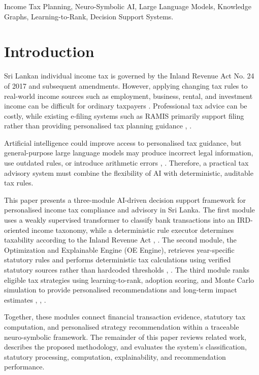 \documentclass[conference]{IEEEtran}
\begin{document}
\begin{IEEEkeywords}
Income Tax Planning, Neuro-Symbolic AI, Large Language Models, Knowledge Graphs, Learning-to-Rank, Decision Support Systems.
\end{IEEEkeywords}

\section{Introduction}
Sri Lankan individual income tax is governed by the Inland Revenue Act No. 24 of 2017 and subsequent amendments. However, applying changing tax rules to real-world income sources such as employment, business, rental, and investment income can be difficult for ordinary taxpayers \cite{b1}. Professional tax advice can be costly, while existing e-filing systems such as RAMIS primarily support filing rather than providing personalised tax planning guidance \cite{b1}, \cite{b2}.

Artificial intelligence could improve access to personalised tax guidance, but general-purpose large language models may produce incorrect legal information, use outdated rules, or introduce arithmetic errors \cite{b3}, \cite{b14}. Therefore, a practical tax advisory system must combine the flexibility of AI with deterministic, auditable tax rules.

This paper presents a three-module AI-driven decision support framework for personalised income tax compliance and advisory in Sri Lanka. The first module uses a weakly supervised transformer to classify bank transactions into an IRD-oriented income taxonomy, while a deterministic rule executor determines taxability according to the Inland Revenue Act \cite{b8}, \cite{b11}. The second module, the Optimization and Explainable Engine (OE Engine), retrieves year-specific statutory rules and performs deterministic tax calculations using verified statutory sources rather than hardcoded thresholds \cite{b16}, \cite{b18}. The third module ranks eligible tax strategies using learning-to-rank, adoption scoring, and Monte Carlo simulation to provide personalised recommendations and long-term impact estimates \cite{b27}, \cite{b29}, \cite{b30}.

Together, these modules connect financial transaction evidence, statutory tax computation, and personalised strategy recommendation within a traceable neuro-symbolic framework. The remainder of this paper reviews related work, describes the proposed methodology, and evaluates the system's classification, statutory processing, computation, explainability, and recommendation performance.
\end{document}
